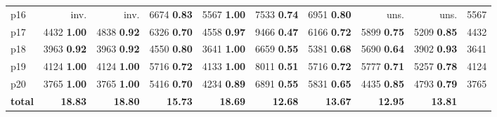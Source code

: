\begin{tabular}{|l|rrrrrrrr|r|}
p16 & inv. & inv. & {\footnotesize 6674} \textbf{0.83} & {\footnotesize 5567} \textbf{1.00} & {\footnotesize 7533} \textbf{0.74} & {\footnotesize 6951} \textbf{0.80} & uns. & uns. & 5567\\
p17 & {\footnotesize 4432} \textbf{1.00} & {\footnotesize 4838} \textbf{0.92} & {\footnotesize 6326} \textbf{0.70} & {\footnotesize 4558} \textbf{0.97} & {\footnotesize 9466} \textbf{0.47} & {\footnotesize 6166} \textbf{0.72} & {\footnotesize 5899} \textbf{0.75} & {\footnotesize 5209} \textbf{0.85} & 4432\\
p18 & {\footnotesize 3963} \textbf{0.92} & {\footnotesize 3963} \textbf{0.92} & {\footnotesize 4550} \textbf{0.80} & {\footnotesize 3641} \textbf{1.00} & {\footnotesize 6659} \textbf{0.55} & {\footnotesize 5381} \textbf{0.68} & {\footnotesize 5690} \textbf{0.64} & {\footnotesize 3902} \textbf{0.93} & 3641\\
p19 & {\footnotesize 4124} \textbf{1.00} & {\footnotesize 4124} \textbf{1.00} & {\footnotesize 5716} \textbf{0.72} & {\footnotesize 4133} \textbf{1.00} & {\footnotesize 8011} \textbf{0.51} & {\footnotesize 5716} \textbf{0.72} & {\footnotesize 5777} \textbf{0.71} & {\footnotesize 5257} \textbf{0.78} & 4124\\
p20 & {\footnotesize 3765} \textbf{1.00} & {\footnotesize 3765} \textbf{1.00} & {\footnotesize 5416} \textbf{0.70} & {\footnotesize 4234} \textbf{0.89} & {\footnotesize 6891} \textbf{0.55} & {\footnotesize 5831} \textbf{0.65} & {\footnotesize 4435} \textbf{0.85} & {\footnotesize 4793} \textbf{0.79} & 3765\\
\hline
\textbf{total} & \textbf{18.83} & \textbf{18.80} & \textbf{15.73} & \textbf{18.69} & \textbf{12.68} & \textbf{13.67} & \textbf{12.95} & \textbf{13.81} & \\
\hline
\end{tabular}

